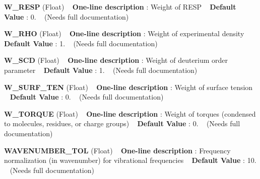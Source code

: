 \begin{DoxyItemize}
\item {\bfseries  W\+\_\+\+R\+E\+SP } (Float) ~\newline
{\bfseries  One-\/line description }\+: Weight of R\+E\+SP ~\newline
{\bfseries  Default Value }\+: 0. ~\newline
(Needs full documentation)\end{DoxyItemize}
\begin{DoxyItemize}
\item {\bfseries  W\+\_\+\+R\+HO } (Float) ~\newline
{\bfseries  One-\/line description }\+: Weight of experimental density ~\newline
{\bfseries  Default Value }\+: 1. ~\newline
(Needs full documentation)\end{DoxyItemize}
\begin{DoxyItemize}
\item {\bfseries  W\+\_\+\+S\+CD } (Float) ~\newline
{\bfseries  One-\/line description }\+: Weight of deuterium order parameter ~\newline
{\bfseries  Default Value }\+: 1. ~\newline
(Needs full documentation)\end{DoxyItemize}
\begin{DoxyItemize}
\item {\bfseries  W\+\_\+\+S\+U\+R\+F\+\_\+\+T\+EN } (Float) ~\newline
{\bfseries  One-\/line description }\+: Weight of surface tension ~\newline
{\bfseries  Default Value }\+: 0. ~\newline
(Needs full documentation)\end{DoxyItemize}
\begin{DoxyItemize}
\item {\bfseries  W\+\_\+\+T\+O\+R\+Q\+UE } (Float) ~\newline
{\bfseries  One-\/line description }\+: Weight of torques (condensed to molecules, residues, or charge groups) ~\newline
{\bfseries  Default Value }\+: 0. ~\newline
(Needs full documentation)\end{DoxyItemize}
\begin{DoxyItemize}
\item {\bfseries  W\+A\+V\+E\+N\+U\+M\+B\+E\+R\+\_\+\+T\+OL } (Float) ~\newline
{\bfseries  One-\/line description }\+: Frequency normalization (in wavenumber) for vibrational frequencies ~\newline
{\bfseries  Default Value }\+: 10. ~\newline
(Needs full documentation)\end{DoxyItemize}
